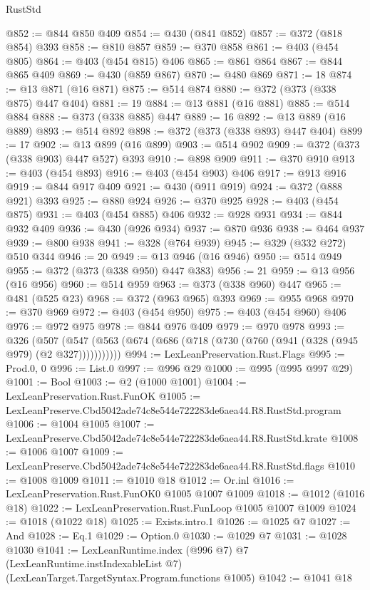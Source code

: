 \begin{lexlean}{RustStd}
\begin{coremodule}
@852 := @844 @850 @409
@854 := @430 (@841 @852)
@857 := @372 (@818 @854) @393
@858 := @810 @857
@859 := @370 @858
@861 := @403 (@454 @805)
@864 := @403 (@454 @815) @406
@865 := @861 @864
@867 := @844 @865 @409
@869 := @430 (@859 @867)
@870 := @480 @869
@871 := 18
@874 := @13 @871 (@16 @871)
@875 := @514 @874
@880 := @372 (@373 (@338 @875) @447 @404)
@881 := 19
@884 := @13 @881 (@16 @881)
@885 := @514 @884
@888 := @373 (@338 @885) @447
@889 := 16
@892 := @13 @889 (@16 @889)
@893 := @514 @892
@898 := @372 (@373 (@338 @893) @447 @404)
@899 := 17
@902 := @13 @899 (@16 @899)
@903 := @514 @902
@909 := @372 (@373 (@338 @903) @447 @527) @393
@910 := @898 @909
@911 := @370 @910
@913 := @403 (@454 @893)
@916 := @403 (@454 @903) @406
@917 := @913 @916
@919 := @844 @917 @409
@921 := @430 (@911 @919)
@924 := @372 (@888 @921) @393
@925 := @880 @924
@926 := @370 @925
@928 := @403 (@454 @875)
@931 := @403 (@454 @885) @406
@932 := @928 @931
@934 := @844 @932 @409
@936 := @430 (@926 @934)
@937 := @870 @936
@938 := @464 @937
@939 := @800 @938
@941 := @328 (@764 @939)
@945 := @329 (@332 @272) @510 @344
@946 := 20
@949 := @13 @946 (@16 @946)
@950 := @514 @949
@955 := @372 (@373 (@338 @950) @447 @383)
@956 := 21
@959 := @13 @956 (@16 @956)
@960 := @514 @959
@963 := @373 (@338 @960) @447
@965 := @481 (@525 @23)
@968 := @372 (@963 @965) @393
@969 := @955 @968
@970 := @370 @969
@972 := @403 (@454 @950)
@975 := @403 (@454 @960) @406
@976 := @972 @975
@978 := @844 @976 @409
@979 := @970 @978
@993 := @326
    (@507 (@547 (@563 (@674 (@686 (@718 (@730 (@760 (@941 (@328 (@945 @979) (@2 @327)))))))))))
@994 := LexLeanPreservation.Rust.Flags
@995 := Prod.{0, 0}
@996 := List.{0}
@997 := @996 @29
@1000 := @995 (@995 @997 @29)
@1001 := Bool
@1003 := @2 (@1000 @1001)
@1004 := LexLeanPreservation.Rust.FunOK
@1005 := LexLeanPreserve.Cbd5042ade74c8e544e722283de6aea44.R8.RustStd.program
@1006 := @1004 @1005
@1007 := LexLeanPreserve.Cbd5042ade74c8e544e722283de6aea44.R8.RustStd.krate
@1008 := @1006 @1007
@1009 := LexLeanPreserve.Cbd5042ade74c8e544e722283de6aea44.R8.RustStd.flags
@1010 := @1008 @1009
@1011 := @1010 @18
@1012 := Or.inl
@1016 := LexLeanPreservation.Rust.FunOK0 @1005 @1007 @1009
@1018 := @1012 (@1016 @18)
@1022 := LexLeanPreservation.Rust.FunLoop @1005 @1007 @1009
@1024 := @1018 (@1022 @18)
@1025 := Exists.intro.{1}
@1026 := @1025 @7
@1027 := And
@1028 := Eq.{1}
@1029 := Option.{0}
@1030 := @1029 @7
@1031 := @1028 @1030
@1041 := LexLeanRuntime.index
    (@996 @7)
    @7
    (LexLeanRuntime.instIndexableList @7)
    (LexLeanTarget.TargetSyntax.Program.functions @1005)
@1042 := @1041 @18

\end{coremodule}
\end{lexlean}
